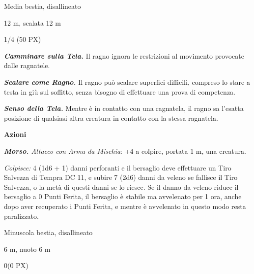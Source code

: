 \begin{multicols}{2}
{
\begin{description}[noitemsep, topsep=0pt, parsep=0pt, partopsep=0pt, itemsep=1pt, leftmargin=2.35cm,  labelwidth=2.2cm, itemindent=0cm, listparindent=0pt] %
\setlength{\baselineskip}{10pt}
\item[\textbf{Taglia/Tipo}] Media bestia, disallineato
\item[\textbf{Caratt.}] 
\item[\textbf{Punti Ferita}] 
\item[\textbf{Tiri Salvez.}] 
\item[\textbf{Movimento}] 12 m, scalata 12 m
\item[\textbf{Sfida}] 1/4 (50 PX)
\end{description}
\smallskip

\emph{\textbf{Camminare sulla Tela.}} Il ragno ignora le restrizioni al movimento provocate dalle ragnatele.

\emph{\textbf{Scalare come Ragno.}} Il ragno può scalare superfici difficili, compreso lo stare a testa in giù sul soffitto, senza bisogno di effettuare una prova di competenza.

\emph{\textbf{Senso della Tela.}} Mentre è in contatto con una ragnatela, il ragno sa l'esatta posizione di qualsiasi altra creatura in contatto con la stessa ragnatela.

\textbf{Azioni}

\emph{\textbf{Morso.} Attacco con Arma da Mischia}: +4 a colpire, portata 1 m, una creatura.

\emph{Colpisce:} 4 (1d6 + 1) danni perforanti e il bersaglio deve effettuare un Tiro Salvezza di Tempra DC 11, e subire 7 (2d6) danni da veleno se fallisce il Tiro Salvezza, o la metà di questi danni se lo riesce. Se il danno da veleno riduce il bersaglio a 0 Punti Ferita, il bersaglio è stabile ma avvelenato per 1 ora, anche dopo aver recuperato i Punti Ferita, e mentre è avvelenato in questo modo resta paralizzato.

\begin{description}[noitemsep, topsep=0pt, parsep=0pt, partopsep=0pt, itemsep=1pt, leftmargin=2.35cm,  labelwidth=2.2cm, itemindent=0cm, listparindent=0pt] %
\setlength{\baselineskip}{10pt}
\item[\textbf{Taglia/Tipo}] Minuscola bestia, disallineato
\item[\textbf{Caratt.}] 
\item[\textbf{Punti Ferita}] 
\item[\textbf{Tiri Salvez.}] 
\item[\textbf{Movimento}] 6 m, nuoto 6 m
\item[\textbf{Sfida}] 0(0 PX)
\end{description}
\smallskip

}
\end{multicols}
